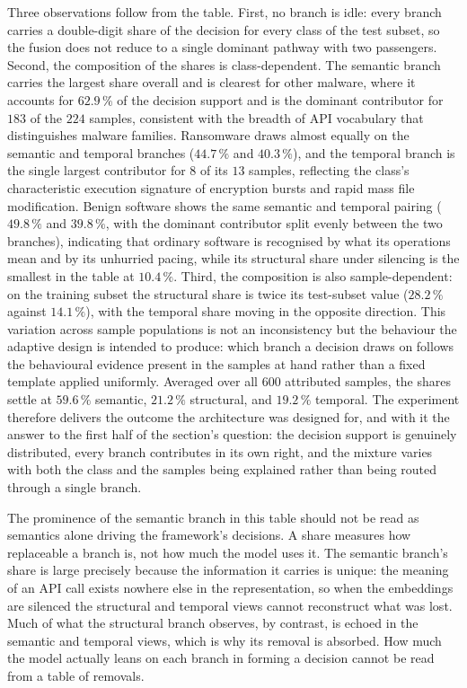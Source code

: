 \documentclass[%
    BCOR=10mm,
    DIV=13,
    toc=bibliography,
    toc=listof,
    oneside,
    12pt,
]{scrbook}
\begin{document}
Three observations follow from the table. First, no branch is idle: every
branch carries a double-digit share of the decision for every class of the test
subset, so the fusion does not reduce to a single dominant pathway with two
passengers. Second, the composition of the shares is class-dependent. The
semantic branch carries the largest share overall and is clearest for other
malware, where it accounts for $62.9\,\%$ of the decision support and is the
dominant contributor for $183$ of the $224$ samples, consistent with the
breadth of API vocabulary that distinguishes malware families. Ransomware draws
almost equally on the semantic and temporal branches ($44.7\,\%$ and
$40.3\,\%$), and the temporal branch is the single largest contributor for $8$
of its $13$ samples, reflecting the class's characteristic execution signature
of encryption bursts and rapid mass file modification. Benign software shows
the same semantic and temporal pairing ($49.8\,\%$ and $39.8\,\%$, with the
dominant contributor split evenly between the two branches), indicating that
ordinary software is recognised by what its operations mean and by its
unhurried pacing, while its structural share under silencing is the smallest in
the table at $10.4\,\%$. Third, the composition is also sample-dependent: on
the training subset the structural share is twice its test-subset value
($28.2\,\%$ against $14.1\,\%$), with the temporal share moving in the opposite
direction. This variation across sample populations is not an inconsistency but
the behaviour the adaptive design is intended to produce: which branch a
decision draws on follows the behavioural evidence present in the samples at
hand rather than a fixed template applied uniformly. Averaged over all $600$
attributed samples, the shares settle at $59.6\,\%$ semantic, $21.2\,\%$
structural, and $19.2\,\%$ temporal. The experiment therefore delivers the
outcome the architecture was designed for, and with it the answer to the first
half of the section's question: the decision support is genuinely distributed,
every branch contributes in its own right, and the mixture varies with both the
class and the samples being explained rather than being routed through a single
branch.

The prominence of the semantic branch in this table should not be read as
semantics alone driving the framework's decisions. A share measures how
replaceable a branch is, not how much the model uses it. The semantic branch's
share is large precisely because the
information it carries is unique: the meaning of an API call exists nowhere
else in the representation, so when the embeddings are silenced the structural
and temporal views cannot reconstruct what was lost. Much of what the
structural branch observes, by contrast, is echoed in the semantic and temporal
views, which is why its removal is absorbed. How much the model actually leans
on each branch in forming a decision cannot be read from a table of removals.
\end{document}
